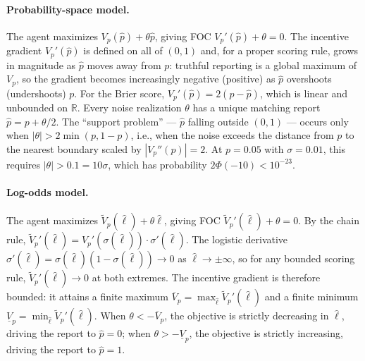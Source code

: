 \documentclass[11pt]{article}
\begin{document}
\paragraph{Probability-space model.} The agent maximizes $V_p(\hat{p}) + \theta\hat{p}$, giving FOC $V_p'(\hat{p}) + \theta = 0$. The incentive gradient $V_p'(\hat{p})$ is defined on all of $(0,1)$ and, for a proper scoring rule, grows in magnitude as $\hat{p}$ moves away from $p$: truthful reporting is a global maximum of $V_p$, so the gradient becomes increasingly negative (positive) as $\hat{p}$ overshoots (undershoots) $p$. For the Brier score, $V_p'(\hat{p}) = 2(p - \hat{p})$, which is linear and unbounded on $\mathbb{R}$. Every noise realization $\theta$ has a unique matching report $\hat{p} = p + \theta/2$. The ``support problem'' --- $\hat{p}$ falling outside $(0,1)$ --- occurs only when $|\theta| > 2\min(p, 1-p)$, i.e., when the noise exceeds the distance from $p$ to the nearest boundary scaled by $|V_p''(p)| = 2$. At $p = 0.05$ with $\sigma = 0.01$, this requires $|\theta| > 0.1 = 10\sigma$, which has probability $2\Phi(-10) < 10^{-23}$.

\paragraph{Log-odds model.} The agent maximizes $\tilde{V}_p(\hat{\ell}) + \theta\hat{\ell}$, giving FOC $\tilde{V}_p'(\hat{\ell}) + \theta = 0$. By the chain rule, $\tilde{V}_p'(\hat{\ell}) = V_p'(\sigma(\hat{\ell})) \cdot \sigma'(\hat{\ell})$. The logistic derivative $\sigma'(\hat{\ell}) = \sigma(\hat{\ell})(1-\sigma(\hat{\ell})) \to 0$ as $\hat{\ell} \to \pm\infty$, so for any bounded scoring rule, $\tilde{V}_p'(\hat{\ell}) \to 0$ at both extremes. The incentive gradient is therefore bounded: it attains a finite maximum $\overline{V}_p = \max_{\hat{\ell}} \tilde{V}_p'(\hat{\ell})$ and a finite minimum $\underline{V}_p = \min_{\hat{\ell}} \tilde{V}_p'(\hat{\ell})$. When $\theta < -\overline{V}_p$, the objective is strictly decreasing in $\hat{\ell}$, driving the report to $\hat{p} = 0$; when $\theta > -\underline{V}_p$, the objective is strictly increasing, driving the report to $\hat{p} = 1$.
\end{document}
